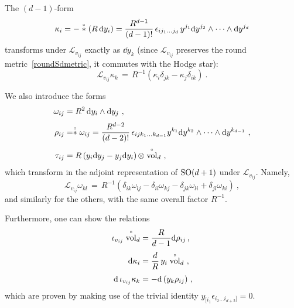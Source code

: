 \documentclass[debug]{phd}
\begin{document}
				The $(d-1)$-form
						\begin{equation}
							\kappa_i = - \stackrel{\scriptscriptstyle{\circ}}{*}(R\,\mathrm{d} y_i) = \frac{R^{d-1}}{(d-1)!}\,\epsilon_{ij_1\ldots j_d}\, y^{j_1}\mathrm{d} y^{j_2}\wedge \cdots \wedge \mathrm{d} y^{j_d}
						\end{equation}
				transforms under $\mathcal{L}_{v_{ij}}$ exactly as $\dd y_k$ (since $\mathcal{L}_{v_{ij}}$ preserves the round metric~\eqref{roundSdmetric}, it commutes with the Hodge star):
						\begin{equation}
							\mathcal{L}_{v_{ij}} \kappa_k \,=\, R^{-1}\left(\kappa_i \delta_{jk} - \kappa_j\delta_{ik}\right) \ .
						\end{equation}

				We also introduce the forms
						\begin{equation}
							\begin{split}
								\omega_{ij} &= R^2\, \mathrm{d} y_i \wedge \mathrm{d} y_j \ , \\[1mm]
								\rho_{ij} &= \stackrel{\scriptscriptstyle{\circ}}{*}\omega_{ij} = \frac{R^{d-2}}{(d-2)!} \,\epsilon_{ijk_1\ldots k_{d-1}} y^{k_1} \mathrm{d} y^{k_2} \wedge \cdots \wedge \mathrm{d} y^{k_{d-1}}\ , \\[1mm]
								\tau_{ij} &= R\left(y_i\mathrm{d}y_j  - y_j\mathrm{d}y_i\right) \otimes \stackrel{\scriptscriptstyle{\circ}}{\rm vol}_d\ ,
							\end{split}
						\end{equation}
				which transform in the adjoint representation of $\mathrm{SO}(d+1)$ under $\mathcal{L}_{v_{ij}}$. Namely,
						\begin{equation}\label{Lie_on_omega}
							\mathcal{L}_{v_{ij}} \omega_{kl} \, = \, R^{-1}\left(\delta_{ik}\omega_{lj} - \delta_{il}\omega_{kj} - \delta_{jk}\omega_{li} + \delta_{jl} \omega_{ki} \right) \ ,
						\end{equation}
				and similarly for the others, with the same overall factor $R^{-1}$.

				Furthermore, one can show the relations
						\begin{align}
								\iota_{v_{ij}} \stackrel{\scriptscriptstyle{\circ}}{\operatorname{vol}}_d &= \frac{R}{d-1} \mathrm{d}\rho_{ij}\, , \label{eq:contrvol}\\[1mm]
								\mathrm{d}\kappa_i &= \frac{d}{R}\, y_i \stackrel{\scriptscriptstyle{\circ}}{\rm vol}_d\ , \\[1mm]
								\mathrm{d} \,\iota_{v_{ij}}\kappa_k &= - \mathrm{d}\,(y_k \rho_{ij}) \ ,
						\end{align}
				which are proven by making use of the trivial identity $y_{[i_1}\epsilon_{i_2\ldots i_{d+2}]}=0$.
\end{document}
